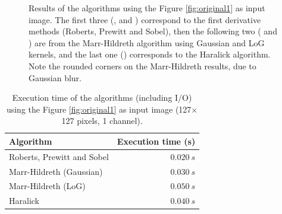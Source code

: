 \documentclass{ipol}
\numberwithin{equation}{section}
\numberwithin{table}{section}
\begin{document}
\begin{figure}[h!]
	\quad
	\quad
	\caption{Results of the algorithms using the Figure \ref{fig:original1} as input image. The first three (,  and ) correspond to the first derivative methods (Roberts, Prewitt and Sobel), then the following two ( and ) are from the Marr-Hildreth algorithm using Gaussian and LoG kernels, and the last one () corresponds to the Haralick algorithm. Note the rounded corners on the Marr-Hildreth results, due to Gaussian blur.}
	\label{fig:result1}
\end{figure}

\begin{table}[h!]
	\begin{center}
	\begin{tabular}{| l | r |}
		\hline \rule{0pt}{3ex}
		\cellcolor[gray]{0.8} \textbf{Algorithm}	& \cellcolor[gray]{0.8} \textbf{Execution time (s)}	\\ \hline \rule{0pt}{3ex}
		Roberts, Prewitt and Sobel					& $0.020 \ s$										\\ \hline \rule{0pt}{3ex}
		Marr-Hildreth (Gaussian)					& $0.030 \ s$										\\ \hline \rule{0pt}{3ex}
		Marr-Hildreth (LoG)							& $0.050 \ s$										\\ \hline \rule{0pt}{3ex}
		Haralick									& $0.040 \ s$										\\
		\hline
	\end{tabular}
	\end{center}
	\caption{Execution time of the algorithms (including I/O) using the Figure \ref{fig:original1} as input image (127$\times$127 pixels, 1 channel).}
	\label{exectime1}
\end{table}
\vspace{0.5cm}
\end{document}

